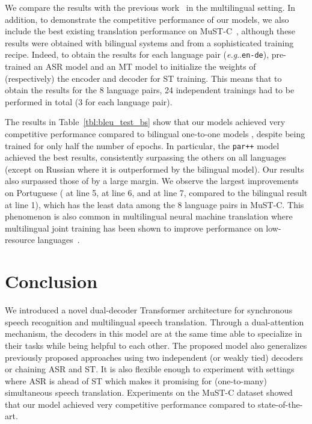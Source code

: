 \documentclass[11pt]{article}
\makeatletter
\DeclareRobustCommand\onedot{\futurelet\@let@token\@onedot}
\def\@onedot{\ifx\@let@token.\else.\null\fi\xspace}
\def\eg{\emph{e.g}\onedot} \def\Eg{\emph{E.g}\onedot}
\theoremstyle{plain}
\theoremstyle{definition}
\newcommand{\var}[1]{\texttt{#1}}
\makeatother
\begin{document}
We compare the results with the previous work~\cite{di2019one} in the multilingual setting. In addition, to demonstrate the competitive performance of our models, we also include the best existing translation performance on MuST-C~\cite{inaguma2020espnet}, although these results were obtained with bilingual systems and from a sophisticated training recipe. Indeed, to obtain the results for each language pair (\eg \var{en-de}),  pre-trained an ASR model and an MT model to initialize the weights of (respectively) the encoder and decoder for ST training. This means that to obtain the results for the 8 language pairs, 24 independent trainings had to be performed in total (3 for each language pair).

The results in Table~\ref{tbl:bleu_test_bs} show that our models achieved very competitive performance compared to bilingual one-to-one models \cite{inaguma2020espnet}, despite being trained for only half the number of epochs. In particular, the \var{par++} model achieved the best results, consistently surpassing the others on all languages (except on Russian where it is outperformed by the bilingual model). Our results also surpassed those of  by a large margin. We observe the largest improvements on Portuguese ( at line 5,  at line 6, and  at line 7, compared to the bilingual result at line 1), which has the least data among the 8 language pairs in MuST-C. This phenomenon is also common in multilingual neural machine translation where multilingual joint training has been shown to improve performance on low-resource languages~\cite{johnson2017google}. 


\section{Conclusion}

We introduced a novel dual-decoder Transformer architecture for synchronous speech recognition and multilingual speech translation. Through a dual-attention mechanism, the decoders in this model are at the same time able to specialize in their tasks while being helpful to each other. 
The proposed model also generalizes previously proposed approaches using two independent (or {weakly tied}) decoders or chaining ASR and ST. It is also flexible enough to experiment with settings where ASR is ahead of ST which makes it promising for (one-to-many) simultaneous speech translation.
Experiments on the MuST-C dataset showed that our model achieved very competitive performance compared to state-of-the-art.
\end{document}
